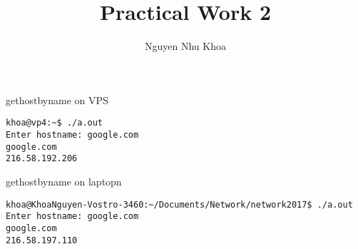 \documentclass{report}
\title{Practical Work 2}
\author{Nguyen Nhu Khoa}
\begin{document}
\maketitle
\begin{section}{gethostbyname on VPS}
\begin{verbatim}
khoa@vp4:~$ ./a.out 
Enter hostname: google.com
google.com
216.58.192.206
\end{verbatim}
\end{section}

\begin{section}{gethostbyname on laptopn}
\begin{verbatim}
khoa@KhoaNguyen-Vostro-3460:~/Documents/Network/network2017$ ./a.out
Enter hostname: google.com
google.com
216.58.197.110
\end{verbatim}
\end{section}
\end{document}
